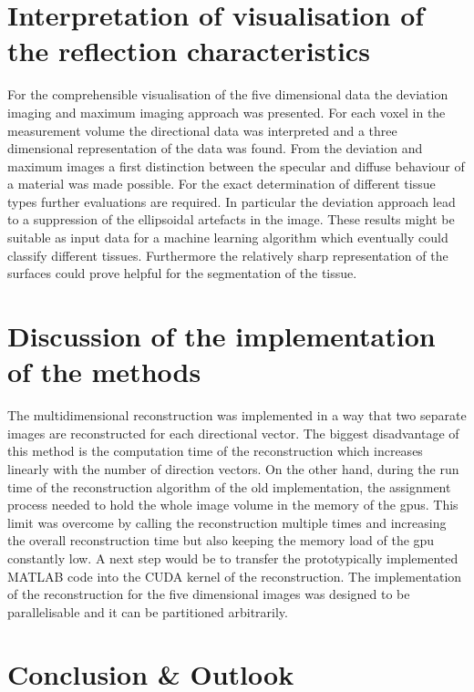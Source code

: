 \section{Interpretation of visualisation of the reflection characteristics}
\label{chap:max_devi}

For the comprehensible visualisation of the five dimensional data the deviation imaging and maximum imaging approach was presented. For each voxel in the measurement volume the directional data was interpreted and a three dimensional representation of the data was found. From the deviation and maximum images a first distinction between the specular and diffuse behaviour of a material was made possible. For the exact determination of different tissue types further evaluations are required. In particular the deviation approach lead to a suppression of the ellipsoidal artefacts in the image. These results might be suitable as input data for a machine learning algorithm which eventually could classify different tissues. Furthermore the relatively sharp representation of the surfaces could prove helpful for the segmentation of the tissue.


\section{Discussion of the implementation of the methods}

The multidimensional reconstruction was implemented in a way that two separate images are reconstructed for each directional vector. The biggest disadvantage of this method is the computation time of the reconstruction which increases linearly with the number of direction vectors. On the other hand, during the run time of the reconstruction algorithm of the old implementation, the assignment process needed to hold the whole image volume in the memory of the \acp{gpu}. This limit was overcome by calling the reconstruction multiple times and increasing the overall reconstruction time but also keeping the memory load of the \ac{gpu} constantly low. A next step would be to transfer the prototypically implemented MATLAB code into the CUDA kernel of the reconstruction. The implementation of the reconstruction for the five dimensional images was designed to be parallelisable and it can be partitioned arbitrarily.




\section{Conclusion \& Outlook}

